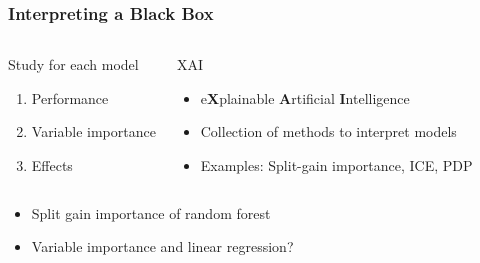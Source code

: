 \begin{frame}
	\frametitle{Interpreting a Black Box}
	\begin{columns}
		\begin{block}{Study for each model}
			\begin{enumerate}
				\item Performance
				\item Variable importance
				\item Effects
			\end{enumerate}
		\end{block}
		\begin{block}{XAI}
			\begin{itemize}
				\item e{\bf X}plainable {\bf A}rtificial {\bf I}ntelligence
				\item Collection of methods to interpret models
				\item Examples: Split-gain importance, ICE, PDP
			\end{itemize}
		\end{block}
	\end{columns}
	
	\vfill
	
	\begin{example}
		\begin{itemize}
			\item Split gain importance of random forest
			\item Variable importance and linear regression?
		\end{itemize}
	\end{example}
\end{frame}


